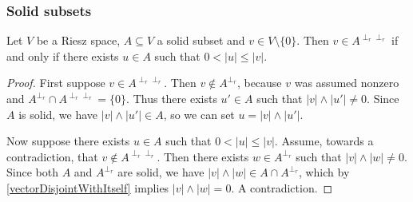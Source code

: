 \subsubsection{Solid subsets}
\begin{proposition} \label{disjointDoublePolarConstruction}
Let $V$ be a Riesz space, $A\subseteq V$ a solid subset and $v\in V\setminus\{0\}$. Then $v\in A^{\perp_r\perp_r}$ \textup{if and only if} there exists $u\in A$ such that $0 < |u| \leq |v|$.
\end{proposition}
\begin{proof}
First suppose $v\in A^{\perp_r\perp_r}$. Then $v\notin A^{\perp_r}$, because $v$ was assumed nonzero and $A^{\perp_r}\cap A^{\perp_r\perp_r} = \{0\}$. Thus there exists $u'\in A$ such that $|v|\wedge |u'| \neq 0$. Since $A$ is solid, we have $|v|\wedge |u'| \in A$, so we can set $u = |v|\wedge |u'|$.

Now suppose there exists $u\in A$ such that $0 < |u| \leq |v|$. Assume, towards a contradiction, that $v\notin A^{\perp_r\perp_r}$. Then there exists $w\in A^{\perp_r}$ such that $|v|\wedge |w| \neq 0$. Since both $A$ and $A^{\perp_r}$ are solid, we have $|v|\wedge |w| \in A\cap A^{\perp_r}$, which by \ref{vectorDisjointWithItself} implies $|v|\wedge |w| = 0$. A contradiction.
\end{proof}

